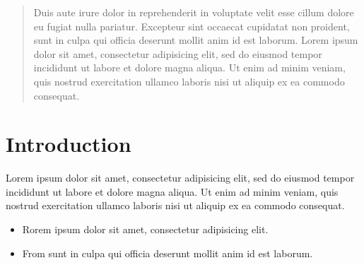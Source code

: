 \documentclass[a0, portrait]{a0poster}
\begin{document}
\begin{multicols}{3} %


\color{Navy} %

\begin{abstract}
Duis aute irure dolor in reprehenderit in voluptate velit esse
cillum dolore eu fugiat nulla pariatur. Excepteur sint occaecat cupidatat non
proident, sunt in culpa qui officia deserunt mollit anim id est laborum. Lorem ipsum dolor sit amet, consectetur adipisicing elit, sed do eiusmod
tempor incididunt ut labore et dolore magna aliqua. Ut enim ad minim veniam,
quis nostrud exercitation ullamco laboris nisi ut aliquip ex ea commodo
consequat.
\end{abstract}

\color{Black} %
\section*{Introduction}
Lorem ipsum dolor sit amet, consectetur adipisicing elit, sed do eiusmod
tempor incididunt ut labore et dolore magna aliqua. Ut enim ad minim veniam,
quis nostrud exercitation ullamco laboris nisi ut aliquip ex ea commodo
consequat.
\begin{itemize}
\item Rorem ipsum dolor sit amet, consectetur adipisicing elit.

\item From sunt in culpa qui officia deserunt mollit anim id est laborum.
\end{itemize}

\color{Black} %


\end{multicols}
\end{document}
